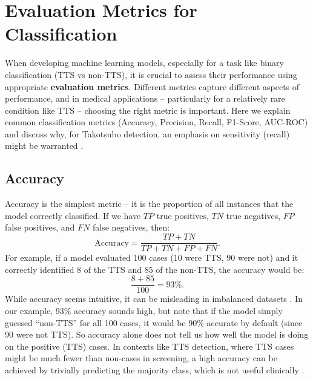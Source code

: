 \documentclass[12pt, BSc]{muthesis}
\begin{document}



\section{Evaluation Metrics for Classification}

When developing machine learning models, especially for a task like binary classification (TTS vs non-TTS), it is crucial to assess their performance using appropriate \textbf{evaluation metrics}. Different metrics capture different aspects of performance, and in medical applications – particularly for a relatively rare condition like TTS – choosing the right metric is important. Here we explain common classification metrics (Accuracy, Precision, Recall, F1-Score, AUC-ROC) and discuss why, for Takotsubo detection, an emphasis on sensitivity (recall) might be warranted \cite{Chicco2020, Laumer2022, Shimizu2022}.

\subsection{Accuracy}
Accuracy is the simplest metric – it is the proportion of all instances that the model correctly classified. If we have $TP$ true positives, $TN$ true negatives, $FP$ false positives, and $FN$ false negatives, then:
\[
\text{Accuracy} = \frac{TP + TN}{TP + TN + FP + FN}.
\]
For example, if a model evaluated 100 cases (10 were TTS, 90 were not) and it correctly identified 8 of the TTS and 85 of the non-TTS, the accuracy would be:
\[
\frac{8 + 85}{100} = 93\%.
\]
While accuracy seems intuitive, it can be misleading in imbalanced datasets \cite{Chicco2020, OwusuAdjei2023}. In our example, 93\% accuracy sounds high, but note that if the model simply guessed ``non-TTS'' for all 100 cases, it would be 90\% accurate by default (since 90 were not TTS). So accuracy alone does not tell us how well the model is doing on the positive (TTS) cases. In contexts like TTS detection, where TTS cases might be much fewer than non-cases in screening, a high accuracy can be achieved by trivially predicting the majority class, which is not useful clinically \cite{Sokolova2009}.
\end{document}
